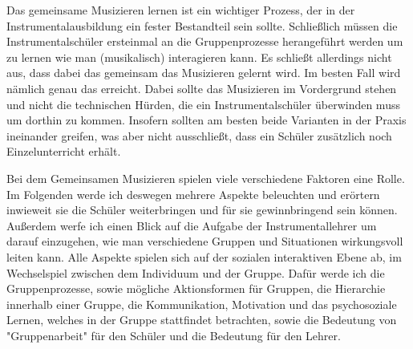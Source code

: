 
Das gemeinsame Musizieren lernen ist ein wichtiger Prozess, der in der
Instrumentalausbildung ein fester Bestandteil sein sollte. Schließlich müssen
die Instrumentalschüler ersteinmal an die Gruppenprozesse herangeführt werden um
zu lernen wie man (musikalisch) interagieren kann. Es schließt allerdings nicht
aus, dass dabei das gemeinsam das Musizieren gelernt wird. Im besten Fall wird nämlich
genau das erreicht. Dabei sollte das Musizieren im Vordergrund stehen und nicht
die technischen Hürden, die ein Instrumentalschüler überwinden muss um dorthin
zu kommen. Insofern sollten am besten beide Varianten in der Praxis ineinander
greifen, was aber nicht ausschließt, dass ein Schüler zusätzlich noch
Einzelunterricht erhält.

Bei dem Gemeinsamen Musizieren spielen viele verschiedene Faktoren eine Rolle.
Im Folgenden werde ich deswegen mehrere Aspekte beleuchten und erörtern
inwieweit sie die Schüler weiterbringen und für sie gewinnbringend sein
können. Außerdem werfe ich einen Blick auf die Aufgabe der
Instrumentallehrer um darauf einzugehen, wie man verschiedene Gruppen und
Situationen wirkungsvoll leiten kann. Alle Aspekte spielen sich auf der sozialen
interaktiven Ebene ab, im Wechselspiel zwischen dem Individuum und der Gruppe.
Dafür werde ich die Gruppenprozesse, sowie mögliche
Aktionsformen für Gruppen, die Hierarchie innerhalb einer Gruppe, die
Kommunikation, Motivation und das psychosoziale Lernen, welches in der Gruppe
stattfindet betrachten, sowie die Bedeutung von "Gruppenarbeit" für den
Schüler und die Bedeutung für den Lehrer.






























